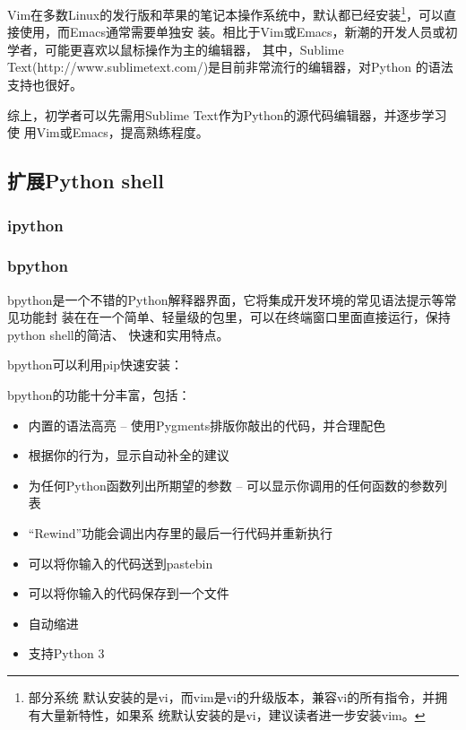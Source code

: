 Vim在多数Linux的发行版和苹果的笔记本操作系统中，默认都已经安装\footnote{部分系统
  默认安装的是vi，而vim是vi的升级版本，兼容vi的所有指令，并拥有大量新特性，如果系
  统默认安装的是vi，建议读者进一步安装vim。}，可以直接使用，而Emacs通常需要单独安
装。相比于Vim或Emacs，新潮的开发人员或初学者，可能更喜欢以鼠标操作为主的编辑器，
其中，Sublime Text(http://www.sublimetext.com/)是目前非常流行的编辑器，对Python
的语法支持也很好。

综上，初学者可以先需用Sublime Text作为Python的源代码编辑器，并逐步学习使
用Vim或Emacs，提高熟练程度。

\subsection{扩展Python shell}

\subsubsection{ipython}

\subsubsection{bpython}
bpython是一个不错的Python解释器界面，它将集成开发环境的常见语法提示等常见功能封
装在在一个简单、轻量级的包里，可以在终端窗口里面直接运行，保持python shell的简洁、
快速和实用特点。

bpython可以利用pip快速安装：


bpython的功能十分丰富，包括：

\begin{itemize}
\item 内置的语法高亮 – 使用Pygments排版你敲出的代码，并合理配色
\item 根据你的行为，显示自动补全的建议
\item 为任何Python函数列出所期望的参数 – 可以显示你调用的任何函数的参数列表
\item “Rewind”功能会调出内存里的最后一行代码并重新执行
\item 可以将你输入的代码送到pastebin
\item 可以将你输入的代码保存到一个文件
\item 自动缩进
\item 支持Python 3
\end{itemize}

